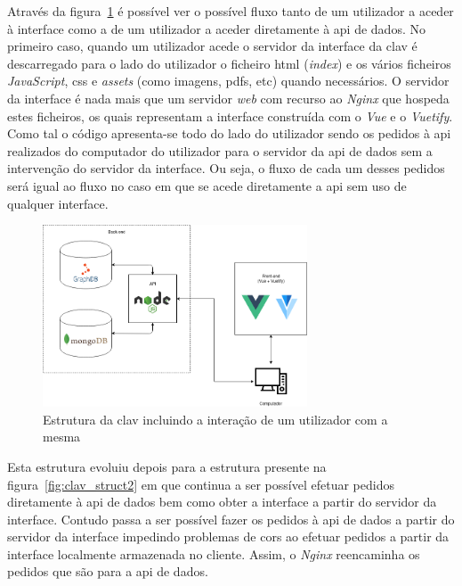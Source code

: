 Através da figura~\ref{fig:clav_struct} é possível ver o possível fluxo tanto de um utilizador a aceder à interface como a de um utilizador a aceder diretamente à \acrshort{api} de dados. No primeiro caso, quando um utilizador acede o servidor da interface da \acrshort{clav} é descarregado para o lado do utilizador o ficheiro \acrshort{html} (\textit{index}) e os vários ficheiros \textit{JavaScript}, \acrshort{css} e \textit{assets} (como imagens, \acrshort{pdf}s, etc) quando necessários. O servidor da interface é nada mais que um servidor \textit{web} com recurso ao \textit{Nginx} que hospeda estes ficheiros, os quais representam a interface construída com o \textit{Vue} e o \textit{Vuetify}. Como tal o código apresenta-se todo do lado do utilizador sendo os pedidos à \acrshort{api} realizados do computador do utilizador para o servidor da \acrshort{api} de dados sem a intervenção do servidor da interface. Ou seja, o fluxo de cada um desses pedidos será igual ao fluxo no caso em que se acede diretamente a \acrshort{api} sem uso de qualquer interface.

\begin{figure}[H]
    \begin{center}
        \includegraphics[width=0.7\textwidth]{img/clav_struct.png}
    \end{center}
    \caption{Estrutura da \acrshort{clav} incluindo a interação de um utilizador com a mesma}\label{fig:clav_struct}
\end{figure}

Esta estrutura evoluiu depois para a estrutura presente na figura~\ref{fig:clav_struct2} em que continua a ser possível efetuar pedidos diretamente à \acrshort{api} de dados bem como obter a interface a partir do servidor da interface. Contudo passa a ser possível fazer os pedidos à \acrshort{api} de dados a partir do servidor da interface impedindo problemas de \acrshort{cors} ao efetuar pedidos a partir da interface localmente armazenada no cliente. Assim, o \textit{Nginx} reencaminha os pedidos que são para a \acrshort{api} de dados.

